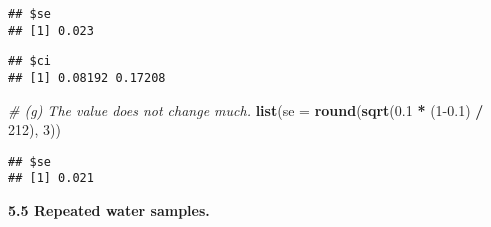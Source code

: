 \documentclass[]{book}
\newenvironment{Shaded}{\begin{snugshade}}{\end{snugshade}}
\newcommand{\CommentTok}[1]{\textcolor[rgb]{0.56,0.35,0.01}{\textit{#1}}}
\newcommand{\DataTypeTok}[1]{\textcolor[rgb]{0.13,0.29,0.53}{#1}}
\newcommand{\DecValTok}[1]{\textcolor[rgb]{0.00,0.00,0.81}{#1}}
\newcommand{\FloatTok}[1]{\textcolor[rgb]{0.00,0.00,0.81}{#1}}
\newcommand{\KeywordTok}[1]{\textcolor[rgb]{0.13,0.29,0.53}{\textbf{#1}}}
\newcommand{\NormalTok}[1]{#1}
\newcommand{\OperatorTok}[1]{\textcolor[rgb]{0.81,0.36,0.00}{\textbf{#1}}}
\newcommand{\StringTok}[1]{\textcolor[rgb]{0.31,0.60,0.02}{#1}}
\begin{document}
\begin{verbatim}
## $se
## [1] 0.023
\end{verbatim}

\begin{Shaded}
\end{Shaded}

\begin{verbatim}
## $ci
## [1] 0.08192 0.17208
\end{verbatim}

\begin{Shaded}
\begin{Highlighting}[]
\CommentTok{# (g) The value does not change much.}
\KeywordTok{list}\NormalTok{(}\DataTypeTok{se =} \KeywordTok{round}\NormalTok{(}\KeywordTok{sqrt}\NormalTok{(}\FloatTok{0.1} \OperatorTok{*}\StringTok{ }\NormalTok{(}\DecValTok{1}\FloatTok{-0.1}\NormalTok{) }\OperatorTok{/}\StringTok{ }\DecValTok{212}\NormalTok{), }\DecValTok{3}\NormalTok{))}
\end{Highlighting}
\end{Shaded}

\begin{verbatim}
## $se
## [1] 0.021
\end{verbatim}

\textbf{5.5 Repeated water samples.}
\end{document}
